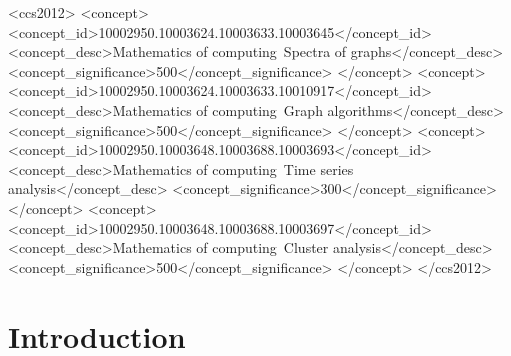 \documentclass[sigconf]{acmart}
\begin{document}

\begin{CCSXML}
<ccs2012>
<concept>
<concept_id>10002950.10003624.10003633.10003645</concept_id>
<concept_desc>Mathematics of computing~Spectra of graphs</concept_desc>
<concept_significance>500</concept_significance>
</concept>
<concept>
<concept_id>10002950.10003624.10003633.10010917</concept_id>
<concept_desc>Mathematics of computing~Graph algorithms</concept_desc>
<concept_significance>500</concept_significance>
</concept>
<concept>
<concept_id>10002950.10003648.10003688.10003693</concept_id>
<concept_desc>Mathematics of computing~Time series analysis</concept_desc>
<concept_significance>300</concept_significance>
</concept>
<concept>
<concept_id>10002950.10003648.10003688.10003697</concept_id>
<concept_desc>Mathematics of computing~Cluster analysis</concept_desc>
<concept_significance>500</concept_significance>
</concept>
</ccs2012>
\end{CCSXML}




\maketitle

\section{Introduction}
\end{document}
